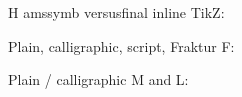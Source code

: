 \documentclass{article}
\begin{document}
\large H amssymb \texttt{\string\between}\quad versus\quad final inline TikZ:
\par\bigskip
{}
\par\bigskip\bigskip
\large Plain, calligraphic, script, Fraktur F:
\par\bigskip
{}
\par\bigskip\bigskip
\large Plain / calligraphic M and L:
\par\bigskip
{}
\end{document}
